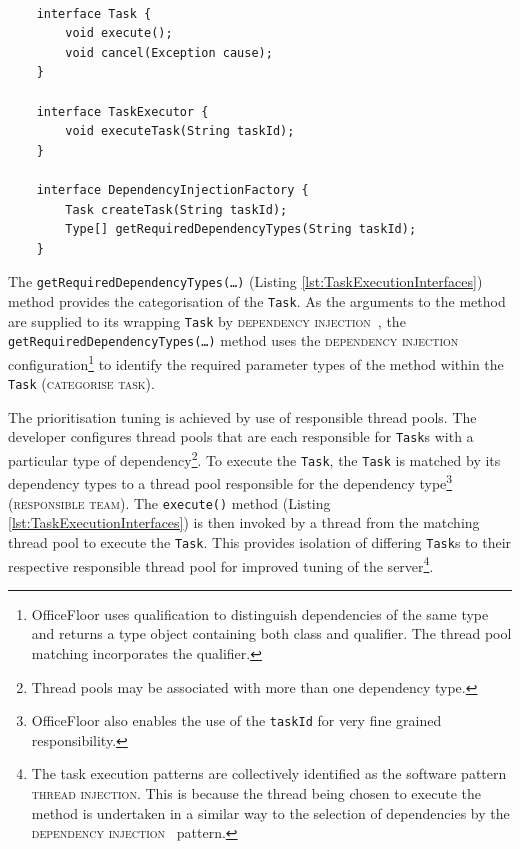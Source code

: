 \documentclass[prodmode]{style/acmlarge}
\begin{document}
\begin{lstlisting}[float,label=lst:TaskExecutionInterfaces]

    interface Task {
        void execute(); 
        void cancel(Exception cause);
    }

    interface TaskExecutor {
        void executeTask(String taskId);
    }

    interface DependencyInjectionFactory {
        Task createTask(String taskId);
        Type[] getRequiredDependencyTypes(String taskId);
    }
\end{lstlisting}


The \texttt{getRequiredDependencyTypes(\ldots)} (Listing
\ref{lst:TaskExecutionInterfaces}) method provides the categorisation of the
\texttt{Task}.  As the arguments to the method are supplied to its wrapping
\texttt{Task} by \textsc{dependency injection}~\cite{ioc}, the
\texttt{getRequiredDependencyTypes(\ldots)} method uses the \textsc{dependency
injection} configuration\footnote{OfficeFloor uses qualification to distinguish
dependencies of the same type and returns a type object containing both class
and qualifier.  The thread pool matching incorporates the qualifier.} to
identify the required parameter types of the method within the \texttt{Task}
(\textsc{categorise task}).

The prioritisation tuning is achieved by use of responsible thread pools.  The
developer configures thread pools that are each responsible for \texttt{Task}s
with a particular type of dependency\footnote{Thread pools may be associated
with more than one dependency type.}.  To execute the \texttt{Task}, the
\texttt{Task} is matched by its dependency types to a thread pool responsible
for the dependency type\footnote{OfficeFloor also enables the use of the
\texttt{taskId} for very fine grained responsibility.} (\textsc{responsible
team}).  The \texttt{execute()} method (Listing
\ref{lst:TaskExecutionInterfaces}) is then invoked by a thread from the matching
thread pool to execute the \texttt{Task}.  This provides isolation of differing
\texttt{Task}s to their respective responsible thread pool for improved tuning
of the server\footnote{The task execution patterns are collectively identified
as the software pattern \textsc{thread injection}.  This is because the thread
being chosen to execute the method is undertaken in a similar way to the
selection of dependencies by the \textsc{dependency injection}~\cite{ioc}
pattern.}.
\end{document}
